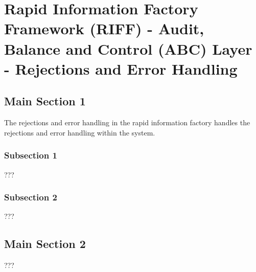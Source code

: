 
\chapter{Rapid Information Factory Framework (RIFF) - Audit, Balance and Control (ABC) Layer - Rejections and Error Handling} %

\label{Chapter31} %



\section{Main Section 1}

The rejections and error handling in the rapid information factory handles the rejections and error handling within the system.

\subsection{Subsection 1}

???


\subsection{Subsection 2}

???


\section{Main Section 2}

???
